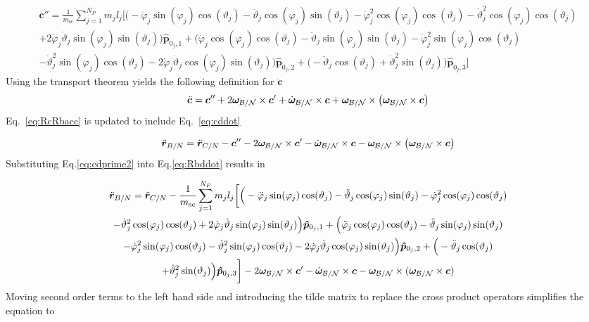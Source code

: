 \documentclass[]{BasiliskReportMemo}
\begin{document}
	
	\begin{multline}
	\bm{c}'' = \frac{1}{m_{\text{sc}}}\sum_{j=1}^{N_{P}}m_j l_j \bigg[
	\Big(-\ddot{\varphi}_j\sin(\varphi_j)\cos(\vartheta_j)-\ddot{\vartheta}_j\cos(\varphi_j)\sin(\vartheta_j)-\dot{\varphi}_j^2\cos(\varphi_j)\cos(\vartheta_j)-\dot{\vartheta}_j^2\cos(\varphi_j)\cos(\vartheta_j)\\+2\dot{\varphi}_j\dot{\vartheta}_j\sin(\varphi_j)\sin(\vartheta_j) \Big)\bm{\hat{p}}_{0_j,1} 
	+\Big(\ddot{\varphi}_j\cos(\varphi_j)\cos(\vartheta_j)-\ddot{\vartheta}_j\sin(\varphi_j)\sin(\vartheta_j)-\dot{\varphi}_j^2\sin(\varphi_j)\cos(\vartheta_j)\\-\dot{\vartheta}_j^2\sin(\varphi_j)\cos(\vartheta_j)-2\dot{\varphi}_j\dot{\vartheta}_j\cos(\varphi_j)\sin(\vartheta_j) \Big)\bm{\hat{p}}_{0_j,2}
	+\Big(-\ddot{\vartheta}_j\cos(\vartheta_j)+\dot{\vartheta}_j^2\sin(\vartheta_j) \Big)\bm{\hat{p}}_{0_j,3}
	\bigg]
	\label{eq:cdprime2}
	\end{multline}
	Using the transport theorem yields the following definition for $\ddot{\bm c}$
	\begin{equation}
	\ddot{\bm c} = \bm{c}'' + 2\bm\omega_{\cal B/N}\times\bm{c}'+\dot{\bm\omega}_{\cal B/N}\times\bm{c}+\bm\omega_{\cal B/N}\times\left(\bm\omega_{\cal B/N}\times\bm{c}\right)
	\label{eq:cddot}
	\end{equation}
	Eq.~\eqref{eq:RcRbacc} is updated to include Eq.~\eqref{eq:cddot}
	
	\begin{equation}
	\ddot{\bm r}_{B/N} = \ddot{\bm r}_{C/N}-\bm{c}'' - 2\bm\omega_{\cal B/N}\times\bm{c}'-\dot{\bm\omega}_{\cal B/N}\times\bm{c}-\bm\omega_{\cal B/N}\times\left(\bm\omega_{\cal B/N}\times\bm{c}\right)
	\label{eq:Rbddot}
	\end{equation}
	Substituting Eq.\eqref{eq:cdprime2} into Eq.\eqref{eq:Rbddot} results in
	
	\begin{multline}
	\ddot{\bm r}_{B/N} = \ddot{\bm r}_{C/N}-\frac{1}{m_{\text{sc}}}\sum_{j=1}^{N_{P}}m_j l_j \bigg[
	\Big(-\ddot{\varphi}_j\sin(\varphi_j)\cos(\vartheta_j)-\ddot{\vartheta}_j\cos(\varphi_j)\sin(\vartheta_j)-\dot{\varphi}_j^2\cos(\varphi_j)\cos(\vartheta_j)\\-\dot{\vartheta}_j^2\cos(\varphi_j)\cos(\vartheta_j)+2\dot{\varphi}_j\dot{\vartheta}_j\sin(\varphi_j)\sin(\vartheta_j) \Big)\bm{\hat{p}}_{0_j,1} 
	+\Big(\ddot{\varphi}_j\cos(\varphi_j)\cos(\vartheta_j)-\ddot{\vartheta}_j\sin(\varphi_j)\sin(\vartheta_j)\\-\dot{\varphi}_j^2\sin(\varphi_j)\cos(\vartheta_j)-\dot{\vartheta}_j^2\sin(\varphi_j)\cos(\vartheta_j)-2\dot{\varphi}_j\dot{\vartheta}_j\cos(\varphi_j)\sin(\vartheta_j) \Big)\bm{\hat{p}}_{0_j,2}
	+\Big(-\ddot{\vartheta}_j\cos(\vartheta_j)\\+\dot{\vartheta}_j^2\sin(\vartheta_j) \Big)\bm{\hat{p}}_{0_j,3}
	\bigg]
	- 2\bm\omega_{\cal B/N}\times\bm c'
	-\dot{\bm\omega}_{\cal B/N}\times\bm{c}-\bm\omega_{\cal B/N}\times(\bm\omega_{\cal B/N}\times\bm{c})
	\label{eq:Rbddot2}
	\end{multline}
	Moving second order terms to the left hand side and introducing the tilde matrix to replace the cross product operators simplifies the equation to
	
\end{document}
